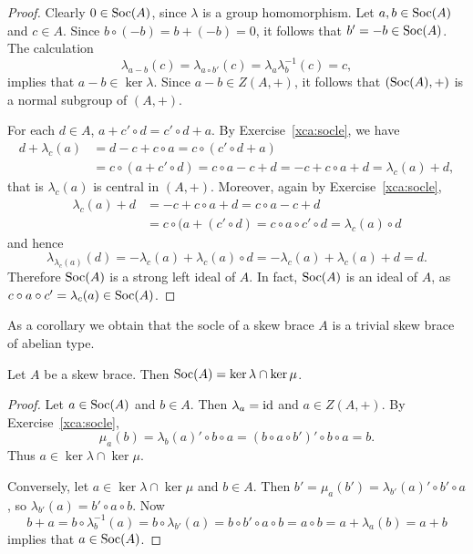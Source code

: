 	
	\begin{proof}
		Clearly $0\in\operatorname{Soc}(A)$, since $\lambda$ is a group homomorphism. Let $a,b\in\operatorname{Soc}(A)$ and $c\in A$. Since 
		$b\circ (-b)=b+(-b)=0$, it follows that 
		$b'=-b\in\operatorname{Soc}(A)$. The calculation 
		\[
		\lambda_{a-b}(c)=\lambda_{a\circ b'}(c)=\lambda_a\lambda^{-1}_b(c)=c,
		\]
 		implies that $a-b\in\ker\lambda$. Since $a-b\in Z(A,+)$, it follows that 
        $(\operatorname{Soc}(A),+)$ is a normal subgroup of $(A,+)$. 
        
        For each $d\in A$, $a+c'\circ d=c'\circ d+a$.  By Exercise~\ref{xca:socle}, we have 
        \begin{align*}
        d+\lambda_c(a) &= d-c+c\circ a
        =c\circ (c'\circ d+a)\\
        &= c\circ (a+c'\circ d)
        = c\circ a-c+d
        = -c+c\circ a+d
        = \lambda_c(a)+d,
        \end{align*}
        that is $\lambda_c(a)$ is central in $(A,+)$. Moreover, again by Exercise~\ref{xca:socle},
        \begin{align*}
            \lambda_c(a)+d &= -c+c\circ a+d 
            = c\circ a-c+d\\
            &= c\circ (a+(c'\circ d)
            = c\circ a\circ c'\circ d=\lambda_c(a)\circ d
        \end{align*}
        and hence 
        \[
        \lambda_{\lambda_c(a)}(d)=-\lambda_c(a)+\lambda_c(a)\circ d=-\lambda_c(a)+\lambda_c(a)+d=d.
        \]
        Therefore $\operatorname{Soc}(A)$ is a strong left ideal of $A$. In fact, $\operatorname{Soc}(A)$ is an ideal of $A$,
        as $c\circ a\circ c'=\lambda_c(a)\in\operatorname{Soc}(A)$.  
	\end{proof}

As a corollary we obtain that the socle of a skew 
brace $A$ is a trivial skew brace of abelian type. 

\begin{proposition}
    \label{pro:soc_kernels}
    Let $A$ be a skew brace. Then $\operatorname{Soc}(A)=\ker\lambda\cap\ker\mu$.
\end{proposition}

\begin{proof}
    Let $a\in\operatorname{Soc}(A)$ and $b\in A$. Then $\lambda_a=\operatorname{id}$ and $a\in Z(A,+)$. By Exercise~\ref{xca:socle}, \[\mu_a(b)=\lambda_b(a)'\circ b\circ a=(b\circ a\circ b')'\circ b\circ a=b.\]  Thus $a\in\ker\lambda\cap\ker\mu$. 
    
    Conversely, let $a\in\ker\lambda\cap\ker\mu$ and $b\in A$. Then $b'=\mu_a(b')=\lambda_{b'}(a)'\circ b'\circ a$, so
    $\lambda_{b'}(a)=b'\circ a\circ b$. Now 
    \[
    b+a=b\circ\lambda^{-1}_b(a)=b\circ\lambda_{b'}(a)=b\circ b'\circ a\circ b=a\circ b=a+\lambda_a(b)=a+b
    \]
    implies that $a\in\operatorname{Soc}(A)$. 
\end{proof}

